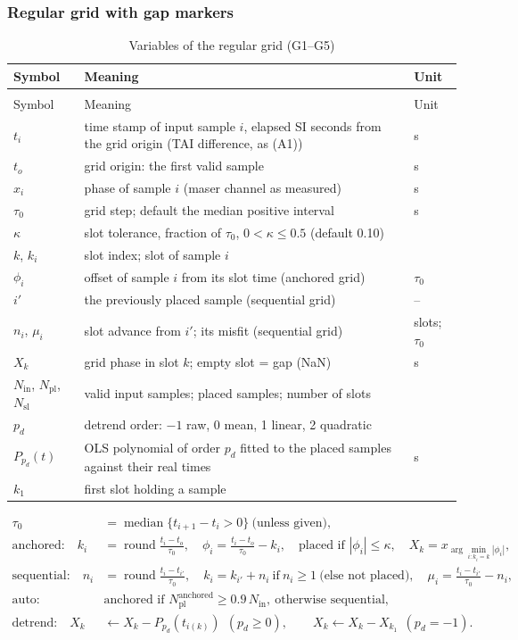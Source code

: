 \documentclass[11pt,a4paper]{article}
\makeatletter
\renewcommand{\_}{\usscore\allowbreak}
\newenvironment{vartable}[2]{%
 \par\small\setlength{\LTpre}{3pt}\setlength{\LTpost}{3pt}%
 \begin{longtable}{@{}>{\raggedright}p{.2\linewidth}>{\raggedright}p{.57\linewidth}>{\raggedright\arraybackslash}p{.17\linewidth}@{}}
 \caption{#2}\label{#1}\\
 \toprule Symbol & Meaning & Unit\\\midrule
 \endfirsthead
 \multicolumn{3}{@{}l}{\footnotesize\itshape Table \thetable{} (continued)}\\
 \toprule Symbol & Meaning & Unit\\\midrule
 \endhead
 \bottomrule
 \endlastfoot}
 {\end{longtable}\normalsize}
\makeatother
\begin{document}
\subsubsection{Regular grid with gap markers}
\begin{vartable}{tab:var-G}{Variables of the regular grid (G1--G5)}
\(t_i\) & time stamp of input sample \(i\), elapsed SI seconds from the grid origin (TAI difference, as (A1)) & s\\
\(t_o\) & grid origin: the first valid sample & s\\
\(x_i\) & phase of sample \(i\) (maser channel as measured) & s\\
\(\tau_0\) & grid step; default the median positive interval & s\\
\(\kappa\) & slot tolerance, fraction of \(\tau_0\), \(0<\kappa\le0.5\) (default 0.10) & 1\\
\(k\), \(k_i\) & slot index; slot of sample \(i\) & 1\\
\(\phi_i\) & offset of sample \(i\) from its slot time (anchored grid) & \(\tau_0\)\\
\(i'\) & the previously placed sample (sequential grid) & --\\
\(n_i\), \(\mu_i\) & slot advance from \(i'\); its misfit (sequential grid) & slots; \(\tau_0\)\\
\(X_k\) & grid phase in slot \(k\); empty slot = gap (NaN) & s\\
\(N_{\mathrm{in}}\), \(N_{\mathrm{pl}}\), \(N_{\mathrm{sl}}\) & valid input samples; placed samples; number of slots & 1\\
\(p_d\) & detrend order: \(-1\) raw, 0 mean, 1 linear, 2 quadratic & 1\\
\(P_{p_d}(t)\) & OLS polynomial of order \(p_d\) fitted to the placed samples against their real times & s\\
\(k_1\) & first slot holding a sample & 1\\
\end{vartable}
\begin{align}
\tau_0&=\operatorname{median}\{t_{i+1}-t_i>0\}\ \text{(unless given)}, \tag{G1}\label{eq:G1}\\
\text{anchored:}\quad k_i&=\operatorname{round}\frac{t_i-t_o}{\tau_0},\quad
\phi_i=\frac{t_i-t_o}{\tau_0}-k_i,\quad \text{placed if } |\phi_i|\le\kappa,\quad
X_k=x_{\arg\min_{i:k_i=k}|\phi_i|}, \tag{G2}\label{eq:G2}\\
\text{sequential:}\quad n_i&=\operatorname{round}\frac{t_i-t_{i'}}{\tau_0},\quad
k_i=k_{i'}+n_i\ \text{if}\ n_i\ge1\ \text{(else not placed)},\quad
\mu_i=\frac{t_i-t_{i'}}{\tau_0}-n_i, \tag{G3}\label{eq:G3}\\
\text{auto:}\quad &\text{anchored if } N_{\mathrm{pl}}^{\mathrm{anchored}}\ge0.9\,N_{\mathrm{in}},\ \text{otherwise sequential}, \tag{G4}\label{eq:G4}\\
\text{detrend:}\quad X_k&\leftarrow X_k-P_{p_d}(t_{i(k)})\ \ (p_d\ge0),\qquad
X_k\leftarrow X_k-X_{k_1}\ \ (p_d=-1). \tag{G5}\label{eq:G5}
\end{align}
\end{document}
